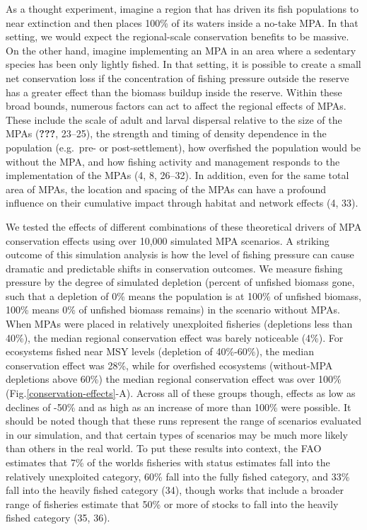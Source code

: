 \documentclass[9pt,twocolumn,twoside,lineno]{pnas-new}
\begin{document}
As a thought experiment, imagine a region that has driven its fish
populations to near extinction and then places 100\% of its waters
inside a no-take MPA. In that setting, we would expect the
regional-scale conservation benefits to be massive. On the other hand,
imagine implementing an MPA in an area where a sedentary species has
been only lightly fished. In that setting, it is possible to create a
small net conservation loss if the concentration of fishing pressure
outside the reserve has a greater effect than the biomass buildup inside
the reserve. Within these broad bounds, numerous factors can act to
affect the regional effects of MPAs. These include the scale of adult
and larval dispersal relative to the size of the MPAs ({\textbf{???}},
23--25), the strength and timing of density dependence in the population
(e.g.~pre- or post-settlement), how overfished the population would be
without the MPA, and how fishing activity and management responds to the
implementation of the MPAs (4, 8, 26--32). In addition, even for the
same total area of MPAs, the location and spacing of the MPAs can have a
profound influence on their cumulative impact through habitat and
network effects (4, 33).

We tested the effects of different combinations of these theoretical
drivers of MPA conservation effects using over 10,000 simulated MPA
scenarios. A striking outcome of this simulation analysis is how the
level of fishing pressure can cause dramatic and predictable shifts in
conservation outcomes. We measure fishing pressure by the degree of
simulated depletion (percent of unfished biomass gone, such that a
depletion of 0\% means the population is at 100\% of unfished biomass,
100\% means 0\% of unfished biomass remains) in the scenario without
MPAs. When MPAs were placed in relatively unexploited fisheries
(depletions less than 40\%), the median regional conservation effect was
barely noticeable (4\%). For ecosystems fished near MSY levels
(depletion of 40\%-60\%), the median conservation effect was 28\%, while
for overfished ecosystems (without-MPA depletions above 60\%) the median
regional conservation effect was over 100\%
(Fig.\ref{conservation-effects}-A). Across all of these groups though,
effects as low as declines of -50\% and as high as an increase of more
than 100\% were possible. It should be noted though that these runs
represent the range of scenarios evaluated in our simulation, and that
certain types of scenarios may be much more likely than others in the
real world. To put these results into context, the FAO estimates that
7\% of the worlds fisheries with status estimates fall into the
relatively unexploited category, 60\% fall into the fully fished
category, and 33\% fall into the heavily fished category (34), though
works that include a broader range of fisheries estimate that 50\% or
more of stocks to fall into the heavily fished category (35, 36).
\end{document}
